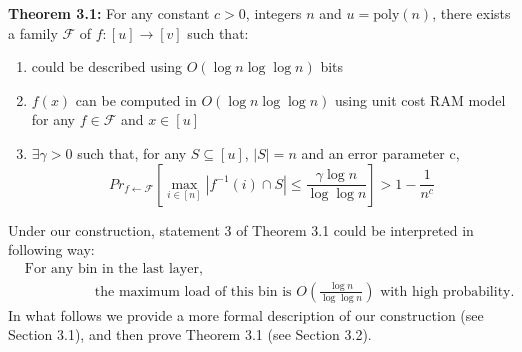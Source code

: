 \documentclass[a4paper, english]{paper}
\begin{document}
	\noindent\textbf{Theorem 3.1:} For any constant $c>0$, integers $n$ and $u=\text{poly}(n)$, there exists a family  $\mathscr{F}$ of $f:[u]\rightarrow[v]$ such that:
	\begin{enumerate}
	\item could be described using $O(\log n \log\log n)$ bits
	\item $f(x)$ can be computed in $O(\log n \log\log n)$ using unit cost RAM model for any $f\in \mathscr{F}$ and $x\in[u]$
	\item $\exists \gamma>0$ such that, for any $S\subseteq[u]$, $|S|=n$ and an error parameter c,
		$${Pr}_{f\leftarrow \mathscr{F}}\left[\max_{i\in[n]}|f^{-1}(i) \cap S|\le \frac{\gamma\log n}{\log\log n}\right]> 1-\frac1{n^c}$$
	\end{enumerate}
	Under our construction, statement 3 of Theorem 3.1 could be interpreted in following way:
	\begin{align*}
	&\text{For any bin in the last layer,}\\
	& \qquad\qquad\quad\text{the maximum load of this bin is } O(\frac{\log n}{\log\log n}) \text{ with high probability.}
	\end{align*}
	In what follows we provide a more formal description of our construction (see Section 3.1), and then prove Theorem 3.1 (see Section 3.2).
	
\end{document}
